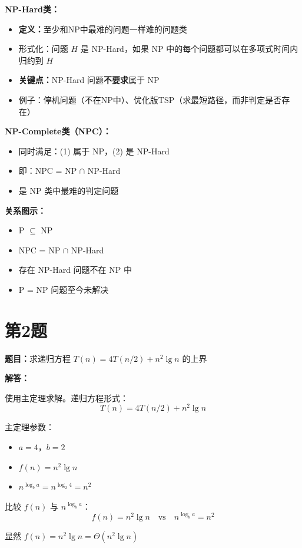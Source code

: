\documentclass[UTF8,12pt,a4paper]{ctexart}
\begin{document}
\textbf{NP-Hard类：}
\begin{itemize}
	\item \textbf{定义：}至少和NP中最难的问题一样难的问题类
	\item 形式化：问题 $H$ 是 NP-Hard，如果 NP 中的每个问题都可以在多项式时间内归约到 $H$
	\item \textbf{关键点：}NP-Hard 问题\textbf{不要求}属于 NP
	\item 例子：停机问题（不在NP中）、优化版TSP（求最短路径，而非判定是否存在）
\end{itemize}

\textbf{NP-Complete类（NPC）：}
\begin{itemize}
	\item 同时满足：(1) 属于 NP，(2) 是 NP-Hard
	\item 即：NPC = NP $\cap$ NP-Hard
	\item 是 NP 类中最难的判定问题
\end{itemize}

\textbf{关系图示：}
\begin{itemize}
	\item P $\subseteq$ NP
	\item NPC = NP $\cap$ NP-Hard
	\item 存在 NP-Hard 问题不在 NP 中
	\item P = NP 问题至今未解决
\end{itemize}


\section*{第2题}
\textbf{题目：}求递归方程 $T(n) = 4 T(n/2) + n^2 \lg n$ 的上界

\textbf{解答：}

使用主定理求解。递归方程形式：
$$T(n) = 4 T(n/2) + n^2 \lg n$$

主定理参数：
\begin{itemize}
	\item $a = 4$，$b = 2$
	\item $f(n) = n^2 \lg n$
	\item $n^{\log_b a} = n^{\log_2 4} = n^2$
\end{itemize}

比较 $f(n)$ 与 $n^{\log_b a}$：
$$f(n) = n^2 \lg n \quad \text{vs} \quad n^{\log_b a} = n^2$$

显然 $f(n) = n^2 \lg n = \Theta(n^2 \lg n)$
\end{document}
